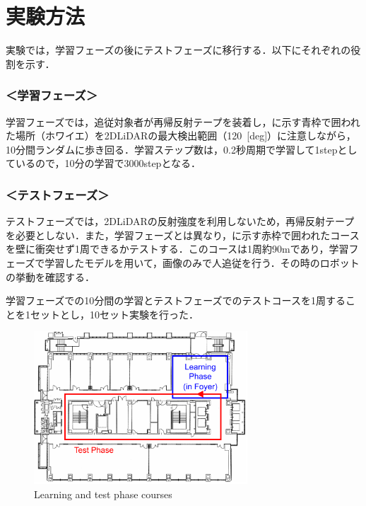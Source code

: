 \section{実験方法}

  実験では，学習フェーズの後にテストフェーズに移行する．以下にそれぞれの役割を示す．

  \subsubsection*{＜学習フェーズ＞}
  学習フェーズでは，追従対象者が再帰反射テープを装着し，に示す青枠で囲われた場所（ホワイエ）を2DLiDARの最大検出範囲（120\, [deg]）に注意しながら，10分間ランダムに歩き回る．学習ステップ数は，0.2秒周期で学習して1stepとしているので，10分の学習で3000stepとなる．

  \subsubsection*{＜テストフェーズ＞}
  テストフェーズでは，2DLiDARの反射強度を利用しないため，再帰反射テープを必要としない．また，学習フェーズとは異なり，に示す赤枠で囲われたコースを壁に衝突せず1周できるかテストする．このコースは1周約90mであり，学習フェーズで学習したモデルを用いて，画像のみで人追従を行う．その時のロボットの挙動を確認する．

  \vspace{0.5cm}

  学習フェーズでの10分間の学習とテストフェーズでのテストコースを1周することを1セットとし，10セット実験を行った．

  \begin{figure}[h]
    \centering
    \includegraphics[width=8cm] {images/pdf/RobotGuidance_course}
    \captionsetup{justification=raggedright} %
    \caption{Learning and test phase courses}
    \label{Fig:RobotGuidance_course}
  \end{figure}

